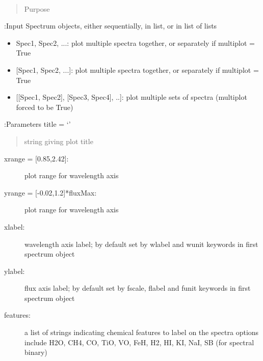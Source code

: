 \documentclass[letterpaper,10pt,english]{sphinxmanual}
\begin{document}
\begin{fulllineitems}
\label{api:splat_plot.plotSpectrum}~\begin{quote}\begin{description}
\item[{Purpose}] \leavevmode
{}

\end{description}\end{quote}

:Input
Spectrum objects, either sequentially, in list, or in list of lists
\begin{itemize}
\item {} 
Spec1, Spec2, ...: plot multiple spectra together, or separately if multiplot = True

\item {} 
{[}Spec1, Spec2, ...{]}: plot multiple spectra together, or separately if multiplot = True

\item {} 
{[}{[}Spec1, Spec2{]}, {[}Spec3, Spec4{]}, ..{]}: plot multiple sets of spectra (multiplot forced to be True)

\end{itemize}

:Parameters
title = `'
\begin{quote}

string giving plot title
\end{quote}
\begin{description}
\item[{xrange = {[}0.85,2.42{]}:}] \leavevmode
plot range for wavelength axis

\item[{yrange = {[}-0.02,1.2{]}*fluxMax:}] \leavevmode
plot range for wavelength axis

\item[{xlabel:}] \leavevmode
wavelength axis label; by default set by wlabel and wunit keywords in first spectrum object

\item[{ylabel:}] \leavevmode
flux axis label; by default set by fscale, flabel and funit keywords in first spectrum object

\item[{features:}] \leavevmode
a list of strings indicating chemical features to label on the spectra
options include H2O, CH4, CO, TiO, VO, FeH, H2, HI, KI, NaI, SB (for spectral binary)


\end{description}
\end{fulllineitems}
\end{document}
